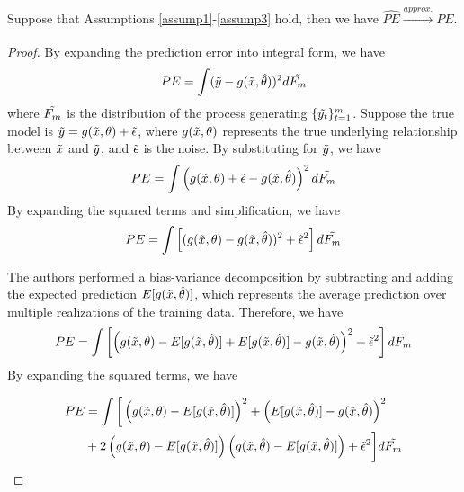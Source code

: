 \documentclass[12pt, oneside]{amsart}
\newenvironment{customthm}[1]
  {\renewcommand\theinnercustomthm{#1}\innercustomthm}
  {\endinnercustomthm}
\theoremstyle{definition}
\theoremstyle{remark}
\numberwithin{equation}{section}
\begin{document}
\begin{customthm}{1}\label{thm1}
Suppose that Assumptions \ref{assump1}-\ref{assump3} hold, then we have $\hat{PE} \xrightarrow[]{approx.} PE$. 
\end{customthm}
\begin{proof}
    
By expanding the prediction error into integral form, we have
$$PE = \int (\Tilde{y} - g(\Tilde{x},\hat{\theta}))^2 d\Tilde{F_m}$$
where $\Tilde{F_m}$ is the distribution of the process generating $\{\Tilde{y_t}\}^m_{t=1}$. Suppose the true model is $\Tilde{y} = g(\Tilde{x}, \theta) + \Tilde{\epsilon}$, where $g(\Tilde{x}, \theta)$ represents the true underlying relationship between $\Tilde{x}$ and $\Tilde{y}$, and $\Tilde{\epsilon}$ is the noise. By substituting for $\Tilde{y}$, we have 
$$PE = \int \left( g(\Tilde{x}, \theta) + \Tilde{\epsilon} - g(\Tilde{x},\hat{\theta}) \right)^2 d\Tilde{F_m}$$ By expanding the squared terms and simplification, we have 
$$PE = \int \left[ (g(\Tilde{x}, \theta) - g(\Tilde{x},\hat{\theta}))^2 + \Tilde{\epsilon}^ 2 \right] d\Tilde{F_m}$$

The authors performed a bias-variance decomposition by subtracting and adding the expected prediction $E[g(\Tilde{x}, \hat{\theta})]$, which represents the average prediction over multiple realizations of the training data. Therefore, we have 
$$ PE = \int \left[ \left(g(\Tilde{x}, \theta) - E[g(\Tilde{x}, \hat{\theta})] + E[g(\Tilde{x}, \hat{\theta})] - g(\Tilde{x},\hat{\theta})\right)^2 + \Tilde{\epsilon}^2 \right] d\Tilde{F_m}$$ By expanding the squared terms, we have

\begin{align*}
    PE &= \int \bigg[ \left(g(\tilde{x},\theta) - E[g(\tilde{x},\hat{\theta})]\right)^2 + \left(E[g(\tilde{x},\hat{\theta})] - g(\tilde{x}, \hat{\theta})\right)^2 \\
    &+ 2 \left( g(\tilde{x}, \theta) - E[g(\tilde{x}, \hat{\theta})]\right) \left( g(\tilde{x},\hat{\theta}) - E[g(\tilde{x}, \hat{\theta})] \right) + \tilde{\epsilon}^2 \bigg] d\Tilde{F_m} 
\end{align*}


\end{proof}
\end{document}
